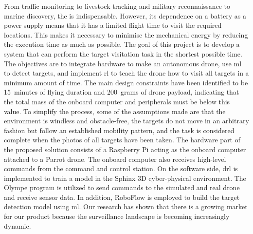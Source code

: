 \documentclass[../main.tex]{subfiles}
\begin{document}
From traffic monitoring to livestock tracking and 
military reconnaissance to marine discovery, the \uav
is indispensable.
However, its dependence on a battery as a power supply means
that it has a limited flight time to visit the required
locations. This makes it necessary to minimise 
the mechanical energy by reducing the execution time as much
as possible.
The goal of this project is to develop a system 
that can perform the target visitation task in the shortest
possible time. The objectives are to integrate hardware to make
an autonomous drone, use \gls{ml} 
to detect targets,
and implement \gls{rl} to 
teach the drone how to visit all targets in a minimum amount of time.
The main design constraints have been identified to be 
\SI{15}{minutes} of flying duration and \SI{200}{grams}
of drone payload, indicating that the total mass of the 
onboard computer and peripherals must be below this
value. To simplify the process, some of the assumptions
made are that the environment is windless and obstacle-free,
the targets do not move in an arbitrary fashion but follow
an established mobility pattern, and the task is considered
complete when the photos of all targets have been taken.
The hardware part of the proposed solution 
consists of a Raspberry Pi acting as the onboard computer
attached to a Parrot \anafi drone. The onboard computer
also receives high-level commands from the command and control
station. On the software side, \gls{drl} is 
implemented to train a model in the Sphinx 3D
cyber-physical environment. The Olympe program is utilized
to send commands to the simulated and real \anafi drone
and receive sensor data. In addition, RoboFlow is employed
to build the target detection model using \gls{ml}.
Our research has shown that there is a growing market for
our product because the surveillance landscape
is becoming increasingly dynamic.
\end{document}
